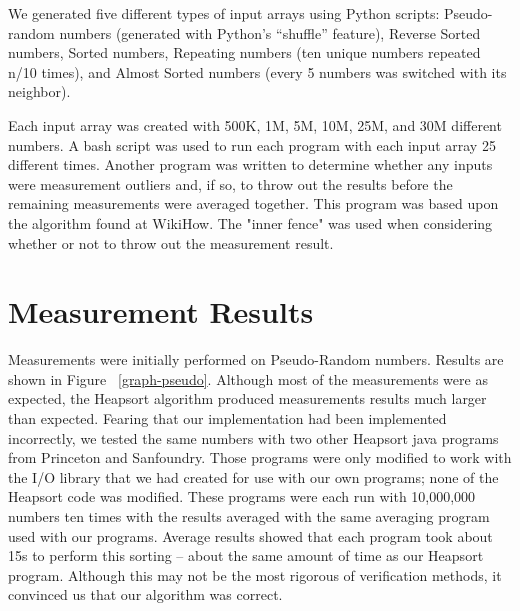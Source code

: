 \documentclass{article}
\begin{document}
We generated five different types of input arrays using Python scripts: Pseudo-random numbers
(generated with Python's ``shuffle'' feature), Reverse Sorted numbers, Sorted numbers, 
Repeating numbers (ten unique numbers repeated n/10 times), and Almost Sorted numbers
(every 5 numbers was switched with its neighbor).

Each input array was created with 500K, 1M, 5M, 10M, 25M, and 30M different numbers.
A bash script was used to run each program with each input array 25 different times.
Another program was written to determine whether any inputs were measurement outliers
and, if so, to throw out the results before the remaining measurements were averaged 
together. This program was based upon the algorithm found at WikiHow\cite{WikiHow}.
The "inner fence" was used when considering whether or not to throw out the measurement
result.

\section{Measurement Results}
Measurements were initially performed on Pseudo-Random numbers. Results are shown in Figure
~\ref{graph-pseudo}. Although most of the measurements were as expected, the Heapsort
algorithm produced measurements results much larger than expected. Fearing that our
implementation had been implemented incorrectly, we tested the same numbers with two
other Heapsort java programs from Princeton\cite{Princeton} and Sanfoundry\cite{Sanfoundry}.
Those programs were only modified to work with the I/O library that we had created for use 
with our own programs; none of the Heapsort code was modified. These programs were each
run with 10,000,000 numbers ten times with the results averaged with the same averaging 
program used with our programs. Average results showed that each program took about 15s
to perform this sorting -- about the same amount of time as our Heapsort program. Although
this may not be the most rigorous of verification methods, it convinced us that our algorithm
was correct.
\end{document}
